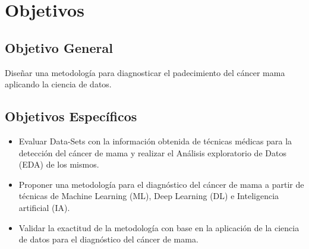 \section{Objetivos}
\subsection{Objetivo General}

Diseñar una metodología para diagnosticar el padecimiento del cáncer mama aplicando la ciencia de datos. 

\subsection{Objetivos Específicos}
\begin{itemize}
	\item Evaluar Data-Sets con la información obtenida de técnicas médicas para la detección del cáncer de mama y realizar el Análisis exploratorio de Datos (EDA) de los mismos.	
	
	\item Proponer una metodología para el diagnóstico del cáncer de mama a partir de técnicas de Machine Learning (ML), Deep Learning (DL) e Inteligencia artificial (IA).
	
	\item Validar la exactitud de la metodología con base en la aplicación de la ciencia de datos para el diagnóstico del cáncer de mama.
\end{itemize}

\newpage
